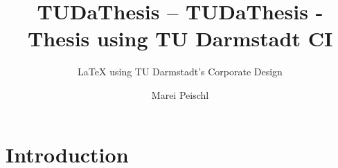 \documentclass[
	enlglish,%
	ruledheaders=section,%
	class=report,%
	thesis={type=bachelor},%
	accentcolor=9c,%
	custommargins=true,%
	marginpar=false,%
	parskip=half-,%
	fontsize=11pt,%
]{tudapub}
\begin{document}

\title{TUDaThesis -- TUDaThesis - Thesis using TU Darmstadt CI}
\subtitle{\LaTeX{} using TU Darmstadt's Corporate Design}
\author[M. Peischl]{Marei Peischl}


\submissiondate{\today}
\examdate{\today}



\maketitle

\tableofcontents

\chapter{Introduction}


\printbibliography
\end{document}
